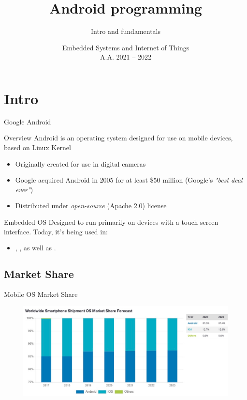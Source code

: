 \documentclass{beamer}
\title[Android -- 1A -- Intro]{Android programming}
\subtitle{Intro and fundamentals}
\date[ver. 1.0 (20220505)]{Embedded Systems and Internet of Things\\A.A. 2021 -- 2022}
\begin{document}
\begin{frame}
\titlepage 
\end{frame}



\section{Intro}

\begin{frame}{Google Android}
\begin{block}{Overview}
Android is an operating system designed for use on mobile devices, based on Linux Kernel
\begin{itemize}
  \item Originally created for use in digital cameras
  \item Google acquired Android in 2005 for at least \$50 million (Google's \textit{"best deal ever"})
  \item Distributed under \textit{open-source} (Apache 2.0) license
\end{itemize}
\end{block}

\begin{block}{Embedded OS}
  Designed to run primarily on devices with a touch-screen interface.\newline
  Today, it's being used in:
  \begin{itemize}
    \item {}, , as well as .
  \end{itemize}
\end{block}
\end{frame}

\subsection{Market Share}

\begin{frame}{Mobile OS Market Share}
  \begin{figure}
    \includegraphics[width=1\linewidth]{figures/android-marketshare.png}
  \end{figure}
\end{frame}
\end{document}
